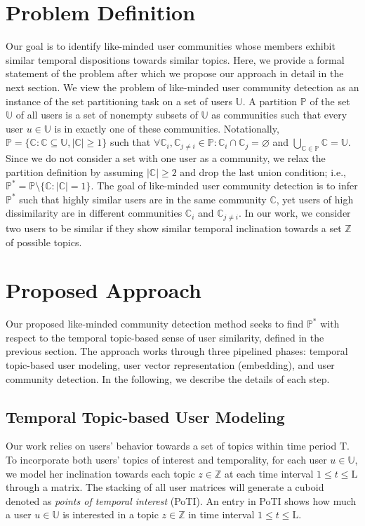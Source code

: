 \documentclass[sigconf]{acmart}
\begin{document}
\section{Problem Definition}
Our goal is to identify like-minded user communities whose members exhibit similar temporal dispositions towards similar topics. Here, we provide a formal statement of the problem after which we propose our approach in detail in the next section. We view the problem of like-minded user community detection as an instance of the set partitioning task on a set of users $\mathbb{U}$. A partition $\mathbb{P}$ of the set $\mathbb{U}$ of all users is a set of nonempty subsets of $\mathbb{U}$ as communities such that every user $u\in\mathbb{U}$ is in exactly one of these communities. Notationally, $\mathbb{P}= \{\mathbb{C}:\mathbb{C}\subseteq\mathbb{U},|\mathbb{C}|\geq 1\}$ such that $\forall\mathbb{C}_i,\mathbb{C}_{j\neq{i}}\in\mathbb{P}:\mathbb{C}_i\cap\mathbb{C}_j=\varnothing$ and $\bigcup_{\mathbb{C}\in\mathbb{P}}\mathbb{C}=\mathbb{U}$. Since we do not consider a set with one user as a community, we relax the partition definition by assuming $|\mathbb{C}|\geq2$ and drop the last union condition; i.e., $\mathbb{P}^*=\mathbb{P}\setminus\{\mathbb{C}:|\mathbb{C}|=1\}$. The goal of like-minded user community detection is to infer $\mathbb{P}^*$ such that highly similar users are in the same community $\mathbb{C}$, yet users of high dissimilarity are in different communities $\mathbb{C}_i$ and $\mathbb{C}_{j\neq{i}}$. In our work, we consider two users to be similar if they show similar temporal inclination towards a set $\mathbb{Z}$ of possible topics.

\section{Proposed Approach}\label{approach}
Our proposed like-minded community detection method seeks to find $\mathbb{P}^*$ with respect to the temporal topic-based sense of user similarity, defined in the previous section. The approach works through three pipelined phases: temporal topic-based user modeling, user vector representation (embedding), and user community detection. In the following, we describe the details of each step.

\subsection{Temporal Topic-based User Modeling}\label{topic_detection}
Our work relies on users' behavior towards a set of topics within time period $\text{T}$. To incorporate both users' topics of interest and temporality, for each user $u\in\mathbb{U}$, we model her inclination towards each topic $z\in\mathbb{Z}$ at each time interval $1\leq{t}\leq\text{L}$ through a matrix. The stacking of all user matrices will generate a cuboid denoted as \textit{points of temporal interest} (PoTI). An entry in PoTI shows how much a user $u\in\mathbb{U}$ is interested in a topic $z\in\mathbb{Z}$ in time interval $1\leq{t}\leq\text{L}$.
\end{document}
